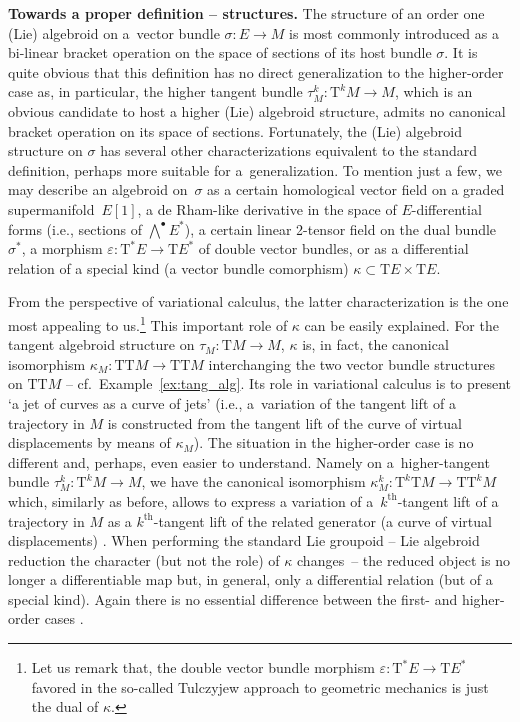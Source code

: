 \documentclass[10pt,a4paper]{amsart}
\newcommand{\Zakrzewski}{{vector bundle comorphism}}
\newcommand{\thh}[1]{#1^{\mathrm{th}}} %
\newcommand{\ra}{\rightarrow}
\newcommand{\eps}{\varepsilon}
\newcommand{\T}{\mathrm{T}} %
\newcommand{\TT}[1]{\mathrm{T}^{#1}} %
\numberwithin{equation}{section}
\theoremstyle{definition}
\begin{document}
{\bf Towards a proper definition -- structures.} The structure of an order one (Lie) algebroid on a~vector bundle $\sigma\colon E\ra M$ is most commonly introduced as a bi-linear bracket operation on the space of sections of its host bundle $\sigma$. It is quite obvious that this definition has no direct gene\-ra\-li\-zation to the higher-order case as, in particular, the higher tangent bundle \mbox{$\tau^k_M\colon \TT{k} M\ra M$}, which is an obvious candidate to host a higher (Lie) algebroid structure, admits no canonical bracket operation on its space of sections. Fortunately, the (Lie) algebroid structure on $\sigma$ has several other characterizations equivalent to the standard definition, perhaps more suitable for a~generalization. To mention just a few, we may describe an algebroid on~$\sigma$ as a certain homological vector field on a graded supermanifold~$E[1]$, a de Rham-like derivative in the space of $E$-differential forms (i.e., sections of $\bigwedge^{\bullet} E^\ast$), a certain linear 2-tensor field on the dual bundle~$\sigma^\ast$, a morphism $\eps\colon \T^\ast E\ra \T E^\ast$ of double vector bundles, or as a differential relation of a special kind (a \Zakrzewski ) $\kappa\subset\T E\times\T E$.

From the perspective of variational calculus, the latter characterization is the one most appealing to us.\footnote{Let us remark that, the double vector bundle morphism $\eps\colon \T^\ast E\ra \T E^\ast$ favored in the so-called Tulczyjew approach to geometric mechanics \cite{GG_var_calc_gen_alg_2008, GGU_geom_mech_alg_2006} is just the dual of $\kappa$.} This important role of $\kappa$ can be easily explained. For the tangent algebroid structure on $\tau_M\colon \T M\ra M$, $\kappa$ is, in fact, the canonical isomorphism $\kappa_M\colon \T\T M\ra \T\T M$ interchanging the two vector bundle structures on $\T\T M$ -- cf.\ Example~\ref{ex:tang_alg}. Its role in variational calculus is to present `a jet of curves as a curve of jets' (i.e., a~variation of the tangent lift of a trajectory in $M$ is constructed from the tangent lift of the curve of virtual displacements by means of $\kappa_M$). The situation in the higher-order case is no different and, perhaps, even easier to understand. Namely on a~higher-tangent bundle $\tau_M^k\colon \TT{k} M\ra M$, we have the canonical isomorphism $\kappa^k_M\colon \TT{k} \T M\ra \T\TT{k} M$ which, similarly as before, allows to express a variation of a~$\thh{k}$-tangent lift of a trajectory in $M$ as a $\thh{k}$-tangent lift of the related generator (a curve of virtual displacements) \cite{MJ_MR_higher_var_calc_2013}. When performing the standard Lie groupoid -- Lie algebroid reduction the character (but not the role) of $\kappa$ changes~-- the reduced object is no longer a differentiable map but, in general, only a differential relation (but of a special kind). Again there is no essential difference between the first- and higher-order cases \cite{MJ_MR_models_high_alg_2015}.
\end{document}
